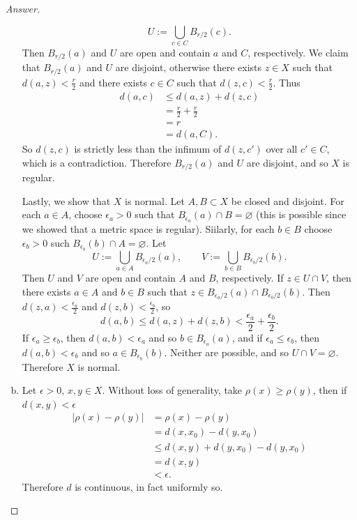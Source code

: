 \documentclass[12pt]{article}
\newcommand\paren[1]{\left( #1 \right)}
\newcommand{\abs}[1]{\left| #1 \right|}
\theoremstyle{definition}
\begin{document}
\begin{proof}[Answer]
\begin{enumerate}[(a)]
        \[
            U := \bigcup\limits_{c \in C} B_{r/2} (c).
        \]
        Then $B_{r/2}(a)$ and $U$ are open and contain $a$ and $C$, respectively. We claim that $B_{r/2}(a)$ and $U$ are disjoint, otherwise there exists $z \in X$ such that $d(a,z) < \frac{r}{2}$ and there exists $c \in C$ such that $d(z,c) < \frac{r}{2}$. Thus
        \begin{align*}
            d(a,c) & \leq d(a,z) + d(z,c) \\
            & = \frac{r}{2} + \frac{r}{2} \\
            & = r \\
            & = d(a,C).
        \end{align*}
        So $d(z,c)$ is strictly less than the infimum of $d(z,c')$ over all $c' \in C$, which is a contradiction. Therefore $B_{r/2}(a)$ and $U$ are disjoint, and so $X$ is regular. 
        
        Lastly, we show that $X$ is normal. Let $A , B \subset X$ be closed and disjoint. For each $a \in A$, choose $\epsilon_a > 0$ such that $B_{\epsilon_a}(a) \cap B = \varnothing$ (this is possible since we showed that a metric space is regular). Siilarly, for each $b \in B$ choose $\epsilon_b > 0$ such $B_{\epsilon_b}(b) \cap A = \varnothing$. Let 
        \[
            U := \bigcup\limits_{a \in A} B_{\epsilon_a / 2}(a) , \qquad V := \bigcup\limits_{b \in B} B_{\epsilon_b / 2}(b) .
        \]
        Then $U$ and $V$ are open and contain $A$ and $B$, respectively. If $z \in U \cap V$, then there exists $a \in A$ and $b \in B$ such that $z \in B_{\epsilon_a/2}(a) \cap B_{\epsilon_b/2}(b)$. Then $d(z,a) < \frac{\epsilon_a}{2}$ and $d(z,b) < \frac{\epsilon_b}{2}$, so 
        \[
            d(a,b) \leq d(a,z) + d(z,b) < \frac{\epsilon_a}{2} + \frac{\epsilon_b}{2}.
        \]
        If $\epsilon_a \geq \epsilon_b$, then $d(a,b) < \epsilon_a$ and so $b \in B_{\epsilon_a}(a)$, and if $\epsilon_a \leq \epsilon_b$, then $d(a,b) < \epsilon_b$ and so $a \in B_{\epsilon_b}(b)$. Neither are possible, and so $U \cap V = \varnothing$. Therefore $X$ is normal.
        \item Let $\epsilon > 0$, $x , y \in X$. Without loss of generality, take $\rho(x) \geq \rho(y)$, then if $d(x,y) < \epsilon$
        \begin{align*}
            \abs{ \rho(x) - \rho(y) } & = \rho(x) - \rho(y) \\
            & = d \paren{ x , x_0 } - d \paren{ y , x_0 } \\
            & \leq d \paren{ x , y } + d \paren{ y , x_0} - d \paren{ y , x_0 } \\
            & = d(x,y) \\
            & < \epsilon.
        \end{align*}
        Therefore $d$ is continuous, in fact uniformly so.
    \end{enumerate}
\end{proof}
\end{document}
